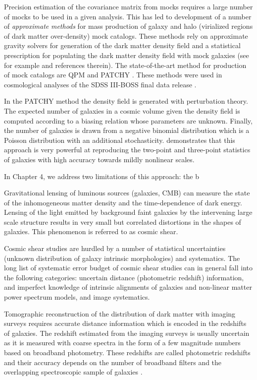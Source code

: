 Precision estimation of the covariance matrix from mocks requires a large number of mocks to be used in a given analysis. This has 
led to development of a number of \emph{approximate} \emph{methods} for mass production of galaxy and halo (virialized regions of dark matter 
over-density) mock catalogs. These methods rely on approximate gravity solvers for generation of the dark matter density field and a statistical 
prescription for populating the dark matter density field with mock galaxies (see for example \citealt{manera2013,qpm,eazymock,kitaura2016} and references 
therein). The state-of-the-art method for production of mock catalogs are QPM \citep{qpm} and PATCHY \citep{kitaura2016}. These methods were used in 
cosmological analyses of the SDSS III-BOSS final data release \citep{alam2016}.

In the PATCHY method the density field is generated with perturbation theory. The expected number of galaxies in a cosmic volume given the 
density field is computed according to a biasing relation whose parameters are unknown. 
Finally, the number of galaxies is drawn from a negative binomial distribution which is a Poisson distribution with an additional stochasticity. 
\citet{nifty} demonstrates that this approach is very powerful at reproducing the two-point and three-point statistics of galaxies with high accuracy towards mildly 
nonlinear scales.

In Chapter 4, we address two limitations of this approach: the b
 
  
Gravitational lensing of luminous sources (galaxies, CMB) can measure 
the state of the inhomogeneous matter density and the time-dependence of dark energy. 
Lensing of the light emitted by background faint galaxies by the intervening large scale structure 
results in very small but correlated distortions in the shapes of galaxies. This phenomenon is referred to 
as cosmic shear.

Cosmic shear studies are hurdled by a number of statistical uncertainties (unknown distribution 
of galaxy intrinsic morphologies) and systematics. The long list of systematic error budget 
of cosmic shear studies can in general fall into the following categories: uncertain distance 
(photometric redshift) information, and imperfect knowledge of intrinsic alignments of galaxies and non-linear matter 
power spectrum models, and image systematics. 

Tomographic reconstruction of the distribution of dark matter with imaging surveys requires 
accurate distance information which is encoded in the redshifts of galaxies. 
The redshift estimated from the imaging surveys is usually uncertain as it is measured with coarse 
spectra in the form of a few magnitude numbers based on broadband photometry. These redshifts are called 
photometric redshifts and their accuracy depends on the number of broadband filters and the overlapping spectroscopic 
sample of galaxies \citep{bonnett2016,choi2016,boris2016,hildebrandt2017}. %

